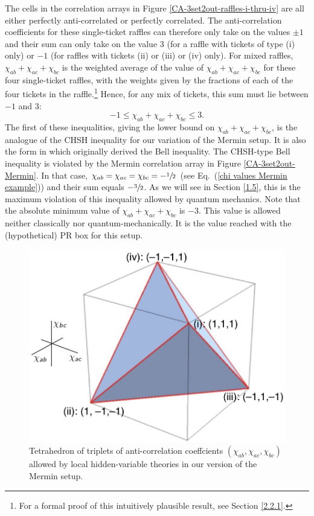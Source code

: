 The cells in the correlation arrays in Figure \ref{CA-3set2out-raffles-i-thru-iv} are all either perfectly anti-correlated or perfectly correlated. The anti-correlation coefficients for these single-ticket raffles can therefore only take on the values $\pm 1$ and their sum can only take on the value 3 (for a raffle with tickets of type (i) only) or $-1$ (for raffles with tickets (ii) or (iii) or (iv) only). For mixed raffles, $\chi_{ab} + \chi_{ac} + \chi_{bc}$ is the weighted average of the value of $\chi_{ab} + \chi_{ac} + \chi_{bc}$ for these four single-ticket raffles, with the weights given by the fractions of each of the four tickets in the raffle.\footnote{For a formal proof of this intuitively plausible result, see Section \ref{2.2.1}.} Hence, for any mix of tickets, this sum must lie between $-1$ and $3$:
\begin{equation}
-1 \le \chi_{ab} + \chi_{ac} + \chi_{bc} \le 3.
\label{Mermin inequality CHSH-like}
\end{equation}
The first of these inequalities, giving the lower bound on $\chi_{ab} + \chi_{ac} + \chi_{bc}$, is the analogue of the CHSH inequality for our variation of the Mermin setup. It is also the form in which \citet{Bell 1964} originally derived the Bell inequality. The CHSH-type Bell inequality is violated by the Mermin correlation array in Figure \ref{CA-3set2out-Mermin}. In that case, $\chi_{ab} = \chi_{ac} = \chi_{bc} = - \sfrac12$ (see Eq.\ (\ref{chi values Mermin example})) and their sum equals $-\sfrac32$. As we will see in Section \ref{1.5}, this is the maximum violation of this inequality allowed by quantum mechanics. Note that the absolute minimum value of $\chi_{ab} + \chi_{ac} + \chi_{bc}$ is $-3$. This value is allowed neither classically nor quantum-mechanically. It is the value reached with the (hypothetical) PR box for this setup.  

\begin{figure}[h]
 \centering
   \includegraphics[width=5in]{tetrahedron.jpeg} 
   \caption{Tetrahedron of triplets of anti-correlation coeffcients $(\chi_{ab}, \chi_{ac}, \chi_{bc})$ allowed by local hidden-variable theories in our version of the Mermin setup.}
   \label{tetrahedron}
\end{figure}

